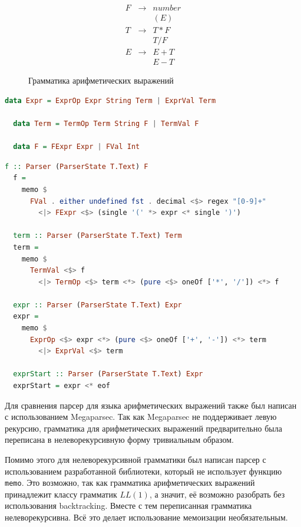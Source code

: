 \documentclass[times]{itmo-student-thesis}
\begin{document}
\begin{figure}[!h]
  \caption{Грамматика арифметических выражений}\label{fig:expr_grammar}
  \[
      \begin{array}{lll}
          F & \to & number \\
            &     & (E) \\
          T & \to & T * F \\
            &     & T / F \\
          E & \to & E + T \\
            &     & E - T
      \end{array}
  \]
\end{figure}

\begin{lstlisting}[language=Haskell,float=!h,caption={Семантические значения языка арифметических выражений},label={lst:expr_semantics}]
  data Expr = ExprOp Expr String Term | ExprVal Term

  data Term = TermOp Term String F | TermVal F

  data F = FExpr Expr | FVal Int
\end{lstlisting}

\begin{lstlisting}[language=Haskell,float=!h,caption={Парсер арифметических выражений},label={lst:expr_parser}]
  f :: Parser (ParserState T.Text) F
  f =
    memo $
      FVal . either undefined fst . decimal <$> regex "[0-9]+"
        <|> FExpr <$> (single '(' *> expr <* single ')')

  term :: Parser (ParserState T.Text) Term
  term =
    memo $
      TermVal <$> f
        <|> TermOp <$> term <*> (pure <$> oneOf ['*', '/']) <*> f

  expr :: Parser (ParserState T.Text) Expr
  expr =
    memo $
      ExprOp <$> expr <*> (pure <$> oneOf ['+', '-']) <*> term
        <|> ExprVal <$> term

  exprStart :: Parser (ParserState T.Text) Expr
  exprStart = expr <* eof
\end{lstlisting}

Для сравнения парсер для языка арифметических выражений также был написан с использованием Megaparsec\cite{megaparsec}.
Так как  Megaparsec не поддерживает левую рекурсию, грамматика для арифметических выражений предварительно была
переписана в нелеворекурсивную форму тривиальным образом. 

Помимо этого для нелеворекурсивной грамматики был написан парсер с использованием разработанной библиотеки, который не
использует функцию \lstinline{memo}. Это возможно, так как грамматика арифметических выражений принадлежит классу
грамматик $LL(1)$, а значит, её возможно разобрать без использования  backtracking. Вместе с тем
переписанная грамматика нелеворекурсивна. Всё это делает использование мемоизации необязательным.
\end{document}
